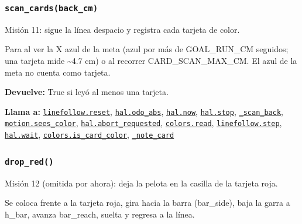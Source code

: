 \subsubsection{\texttt{scan\_\allowbreak{}cards(back\_\allowbreak{}cm)}}\label{fn:autonomous:scan-cards}
\noindent Misión 11: sigue la línea despacio y registra cada tarjeta de color.

Para al ver la X azul de la meta (azul por más de GOAL\_RUN\_CM seguidos; una tarjeta mide \textasciitilde{}4.7 cm) o al recorrer CARD\_SCAN\_MAX\_CM. El azul de la meta no cuenta como tarjeta.

\par{}\par\smallskip
\noindent\textbf{Devuelve:} True si leyó al menos una tarjeta.\par
\noindent\textbf{Llama a:} \hyperref[fn:linefollow:reset]{\texttt{linefollow.reset}}, \hyperref[fn:hal:odo-abs]{\texttt{hal.odo\_\allowbreak{}abs}}, \hyperref[fn:hal:now]{\texttt{hal.now}}, \hyperref[fn:hal:stop]{\texttt{hal.stop}}, \hyperref[fn:autonomous:-scan-back]{\texttt{\_\allowbreak{}scan\_\allowbreak{}back}}, \hyperref[fn:motion:sees-color]{\texttt{motion.sees\_\allowbreak{}color}}, \hyperref[fn:hal:abort-requested]{\texttt{hal.abort\_\allowbreak{}requested}}, \hyperref[fn:colors:read]{\texttt{colors.read}}, \hyperref[fn:linefollow:step]{\texttt{linefollow.step}}, \hyperref[fn:hal:wait]{\texttt{hal.wait}}, \hyperref[fn:colors:is-card-color]{\texttt{colors.is\_\allowbreak{}card\_\allowbreak{}color}}, \hyperref[fn:autonomous:-note-card]{\texttt{\_\allowbreak{}note\_\allowbreak{}card}}\par

\subsubsection{\texttt{drop\_\allowbreak{}red()}}\label{fn:autonomous:drop-red}
\noindent Misión 12 (omitida por ahora): deja la pelota en la casilla de la tarjeta roja.

Se coloca frente a la tarjeta roja, gira hacia la barra (bar\_side), baja la garra a h\_bar, avanza bar\_reach, suelta y regresa a la línea.

